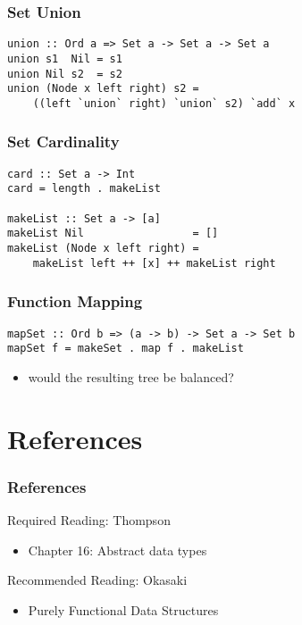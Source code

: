 \documentclass[dvipsnames]{beamer}
\theoremstyle{plain}
\begin{document}
\begin{frame}[fragile]
  \frametitle{Set Union}

  \begin{lstlisting}[deletekeywords={union}]
union :: Ord a => Set a -> Set a -> Set a
union s1  Nil = s1
union Nil s2  = s2
union (Node x left right) s2 =
    ((left `union` right) `union` s2) `add` x
  \end{lstlisting}
\end{frame}

\begin{frame}[fragile]
  \frametitle{Set Cardinality}

  \begin{lstlisting}
card :: Set a -> Int
card = length . makeList

makeList :: Set a -> [a]
makeList Nil                 = []
makeList (Node x left right) =
    makeList left ++ [x] ++ makeList right
  \end{lstlisting}
\end{frame}

\begin{frame}[fragile]
  \frametitle{Function Mapping}

  \begin{lstlisting}
mapSet :: Ord b => (a -> b) -> Set a -> Set b
mapSet f = makeSet . map f . makeList
  \end{lstlisting}

  \pause
  \bigskip
  \begin{itemize}
    \item would the resulting tree be balanced?
  \end{itemize}
\end{frame}

\section*{References}

\begin{frame}
  \frametitle{References}

  \begin{block}{Required Reading: Thompson}
    \begin{itemize}
      \item Chapter 16: \alert{Abstract data types}
    \end{itemize}
  \end{block}

  \begin{block}{Recommended Reading: Okasaki}
    \begin{itemize}
      \item Purely Functional Data Structures
    \end{itemize}
  \end{block}
\end{frame}
\end{document}
